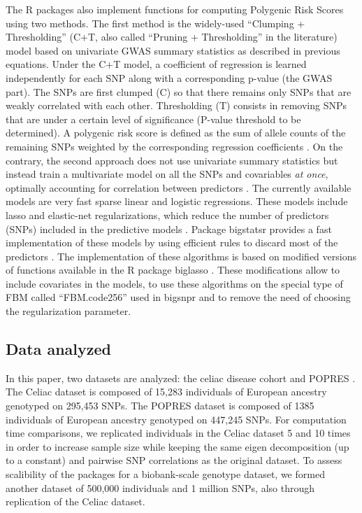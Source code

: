 \documentclass{bioinfo}
\begin{document}
\begin{methods}
The R packages also implement functions for computing Polygenic Risk Scores using two methods. 
The first method is the widely-used ``Clumping + Thresholding'' (C+T, also called ``Pruning + Thresholding'' in the literature) model based on univariate GWAS summary statistics as described in previous equations.
Under the C+T model, a coefficient of regression is learned independently for each SNP along with a corresponding p-value (the GWAS part). The SNPs are first clumped (C) so that there remains only SNPs that are weakly correlated with each other. Thresholding (T) consists in removing SNPs that are under a certain level of significance (P-value threshold to be determined). A polygenic risk score is defined as the sum of allele counts of the remaining SNPs weighted by the corresponding regression coefficients \cite[]{Chatterjee2013,Dudbridge2013,Euesden2015}. 
On the contrary, the second approach does not use univariate summary statistics but instead train a multivariate model on all the SNPs and covariables \textit{at once}, optimally accounting for correlation between predictors \cite[]{Abraham2012}. The currently available models are very fast sparse linear and logistic regressions. These models include lasso and elastic-net regularizations, which reduce the number of  predictors (SNPs) included in the predictive models \cite[]{Friedman2010,Tibshirani1996,Zou2005}. Package bigstatsr provides a fast implementation of these models by using efficient rules to discard most of the predictors \cite[]{Tibshirani2012}. The implementation of these algorithms is based on modified versions of functions available in the R package biglasso \cite[]{Zeng2017}. These modifications allow to include covariates in the models, to use these algorithms on the special type of FBM called ``FBM.code256'' used in bigsnpr and to remove the need of choosing the regularization parameter.

\subsection{Data analyzed}

In this paper, two datasets are analyzed: the celiac disease cohort and POPRES \cite[]{Dubois2010,Nelson2008}. The Celiac dataset is composed of 15,283 individuals of European ancestry genotyped on 295,453 SNPs. The POPRES dataset is composed of 1385 individuals of European ancestry genotyped on 447,245 SNPs.
For computation time comparisons, we replicated individuals in the Celiac dataset 5 and 10 times in order to increase sample size while keeping the same eigen decomposition (up to a constant) and pairwise SNP correlations as the original dataset. To assess scalibility of the packages for a biobank-scale genotype dataset, we formed another dataset of 500,000 individuals and 1 million SNPs, also through replication of the Celiac dataset. \label{sec:rep}


\end{methods}
\end{document}
